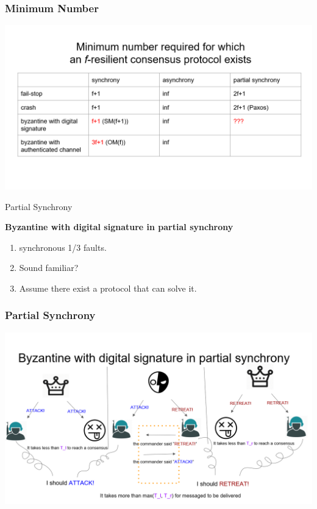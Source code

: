 \documentclass{beamer}
\begin{document}
\begin{frame}
    \frametitle{Minimum Number}
    \centering
    \includegraphics[width=\textwidth, height=\textheight, keepaspectratio]{image3/table2.png}
\end{frame}



\begin{frame}{Partial Synchrony}
\begin{center}
    \textbf{\Huge Byzantine with digital signature in partial synchrony}
\end{center}

\vspace{1cm}  %

\begin{enumerate}
    \item synchronous 1/3 faults.

    \item Sound familiar?
    \item Assume there exist a protocol that can solve it.

\end{enumerate}

\end{frame}


\begin{frame}
    \frametitle{Partial Synchrony}
    \centering
    \includegraphics[width=\textwidth, height=\textheight, keepaspectratio]{image3/digital_signature.png}
\end{frame}
\end{document}
